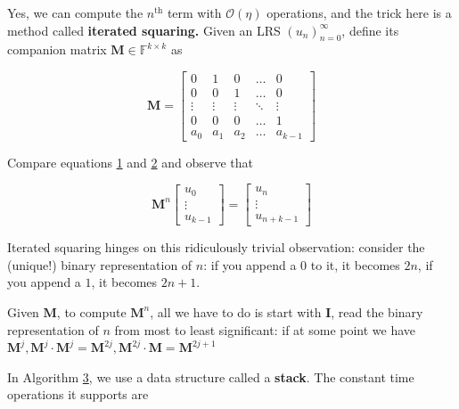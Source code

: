 \documentclass[10.8pt,oneside,reqno]{article}
\begin{document}
Yes, we can compute the $n^{\text{th}}$ term with $\mathcal{O}(\eta)$ operations, and the trick here is a method called \textbf{iterated squaring.}
Given an LRS $( u_n )^{\infty} _{n=0}$, define its companion matrix $\mathbf{M} \in \mathbb{F}^{k \times k}$  as 
\begin{center}
\begin{equation}    
    \label{eq:2}
    \mathbf{M} = \begin{bmatrix}
    0 & 1 & 0 & \dots & 0 \\
    0 & 0 & 1 & \dots & 0 \\
    \vdots & \vdots & \vdots & \ddots & \vdots \\
    0 & 0 & 0 & \dots & 1 \\
    a_0 & a_1 & a_2 & \dots & a_{k-1}
    \end{bmatrix}
\end{equation} 
\end{center}
Compare equations \hyperref[eq:1]{1} and \hyperref[eq:2]{2} and observe that 
\begin{center}
    \begin{equation}
        \label{eq:3}
        \mathbf{M}^{n} \begin{bmatrix}
        u_0 \\
        \vdots \\
        u_{k-1}
    \end{bmatrix} = \begin{bmatrix}
        u_n \\
        \vdots \\
        u_{n+k-1}
    \end{bmatrix}\end{equation}
\end{center}  

Iterated squaring hinges on this ridiculously trivial observation: consider the (unique!) binary representation of $n$: if you append a $0$ to it, it becomes $2n$, if you append a $1$, it becomes $2n + 1$. 

Given $\mathbf{M}$, to compute $\mathbf{M}^{n}$, all we have to do is start with $\mathbf{I}$, read the binary representation of $n$ from most to least significant: if at some point we have $\mathbf{M}^j ,\mathbf{M}^j \cdot \mathbf{M}^j = \mathbf{M}^{2j}, \mathbf{M}^{2j} \cdot \mathbf{M} = \mathbf{M}^{2j+1}$ 

In Algorithm \hyperref[algo:3]{3}, we use a data structure called a \textbf{stack}. The constant time operations it supports are 
\end{document}
